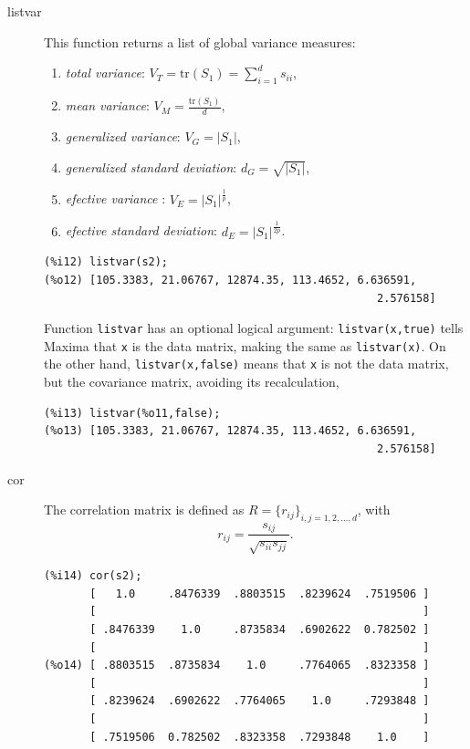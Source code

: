 \documentclass[12pt,a4paper]{article}
\begin{document}
\begin{description}
\item[listvar] This function returns a list of global variance measures:
\begin{enumerate}
\item \emph{total variance}: $V_T=\mbox{tr}(S_1)=\sum_{i=1}^d s_{ii}$,
\item \emph{mean variance}: $V_M=\frac{\mbox{tr}(S_1)}{d}$,
\item \emph{generalized variance}: $V_G=|S_1|$,
\item \emph{generalized standard deviation}: $d_G=\sqrt{|S_1|}$,
\item \emph{efective variance} \cite{pena}: $V_E=|S_1|^\frac{1}{p}$,
\item \emph{efective standard deviation}: $d_E=|S_1|^\frac{1}{2p}$.
\end{enumerate}
\begin{verbatim}
(%i12) listvar(s2);
(%o12) [105.3383, 21.06767, 12874.35, 113.4652, 6.636591,
                                                   2.576158]
\end{verbatim}

Function \verb|listvar| has an optional logical argument: \verb|listvar(x,true)| tells Maxima that \verb|x| is the data matrix, making the same as \verb|listvar(x)|. On the other hand, \verb|listvar(x,false)| means that \verb|x| is not the data matrix, but the covariance matrix, avoiding its recalculation,
\begin{verbatim}
(%i13) listvar(%o11,false);
(%o13) [105.3383, 21.06767, 12874.35, 113.4652, 6.636591,
                                                   2.576158]
\end{verbatim}


\item[cor] The correlation matrix is defined as $R=\{r_{ij}\}_{i,j = 1, 2, \ldots, d}$, with
\[
r_{ij}=\frac{s_{ij}}{\sqrt{s_{ii} s_{jj}}}.
\]
\begin{verbatim}
(%i14) cor(s2);
       [   1.0     .8476339  .8803515  .8239624  .7519506 ]
       [                                                  ]
       [ .8476339    1.0     .8735834  .6902622  0.782502 ]
       [                                                  ]
(%o14) [ .8803515  .8735834    1.0     .7764065  .8323358 ]
       [                                                  ]
       [ .8239624  .6902622  .7764065    1.0     .7293848 ]
       [                                                  ]
       [ .7519506  0.782502  .8323358  .7293848    1.0    ]
\end{verbatim}


\end{description}
\end{document}
